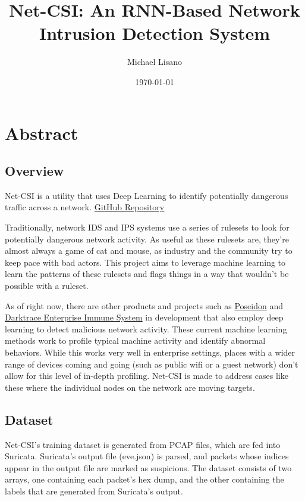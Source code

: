 \documentclass{article}
\title{Net-CSI: An RNN-Based Network Intrusion Detection System}
\author{Michael Lisano}
\date{\today}
\begin{document}
\graphicspath{ {../assets/logo.png} }
\maketitle

\section*{Abstract}

\subsection*{Overview}

Net-CSI is a utility that uses Deep Learning to identify potentially dangerous traffic across a network. \href{https://github.com/turtlebasket/net-csi}{GitHub Repository}

Traditionally, network IDS and IPS systems use a series of rulesets to look for potentially dangerous network activity. As useful as these rulesets are, they're almost always a game of cat and mouse, as industry and the community try to keep pace with bad actors. This project aims to leverage machine learning to learn the patterns of these rulesets and flags things in a way that wouldn't be possible with a ruleset.

As of right now, there are other products and projects such as \href{https://github.com/CyberReboot/poseidon}{Poseidon} and \href{https://www.darktrace.com/en/products/enterprise/}{Darktrace Enterprise Immune System} in development that also employ deep learning to detect malicious network activity. These current machine learning methods work to profile typical machine activity and identify abnormal behaviors. While this works very well in enterprise settings, places with a wider range of devices coming and going (such as public wifi or a guest network) don't allow for this level of in-depth profiling. Net-CSI is made to address cases like these where the individual nodes on the network are moving targets.

\subsection*{Dataset}
Net-CSI's training dataset is generated from PCAP files, which are fed into Suricata. Suricata's output file (eve.json) is parsed, and packets whose indices appear in the output file are marked as suspicious. The dataset consists of two arrays, one containing each packet's hex dump, and the other containing the labels that are generated from Suricata's output.
\end{document}
